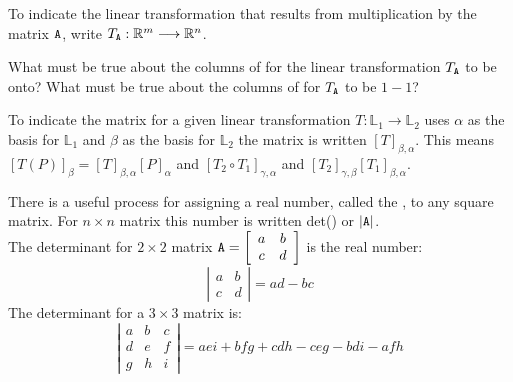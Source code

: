 To indicate the linear transformation that results from multiplication by the matrix $\texttt{A}$,  write $T_{\texttt{A}} :\mathbb{R}^m \longrightarrow \mathbb{R}^n$.

\vspace{.5cm}

\noindent {} What must be true about the columns of  for the linear transformation $T_{\texttt{A}}$ to be onto?  What must be true about the columns of  for $T_{\texttt{A}}$ to be  $1-1$?

\vspace{.5cm}

To indicate the  matrix for a given linear transformation $T:\mathbb{L}_1 \longrightarrow \mathbb{L}_2$ uses $\alpha$  as the basis for  $\mathbb{L}_1$ and $\beta$ as the basis for $\mathbb{L}_2$ the matrix is written $[T]_{\beta, \alpha}$. This means $[T(P)]_{\beta}
=[T]_{\beta, \alpha}[P]_{\alpha}$ and $[T_2 \circ T_1]_{\gamma, \alpha}$ and $[T_2]_{\gamma, \beta}[T_1]_{\beta, \alpha}$.

\vspace{.5cm}

 
 \begin{defn} 
      There is a useful process for assigning a real number, called the , to any square matrix. For $n\times n$  matrix  this number is written det() or $|\texttt{A}|$.\\ 
      The determinant for  $2 \times 2$ matrix $\texttt{A}= \left[ \begin{array}{cc}a&b\\c&d \end{array} \right]$ is the real number: \[ \left| \begin{array}{cc}a&b\\c&d \end{array} \right| = ad-bc \] 
     The determinant for a $3 \times 3$ matrix is: \[\left| \begin{array}{ccc}a&b&c\\d&e&f\\g&h&i \end{array} \right| = aei+bfg+cdh-ceg-bdi-afh\]
\end{defn}

\vspace{.5cm}

